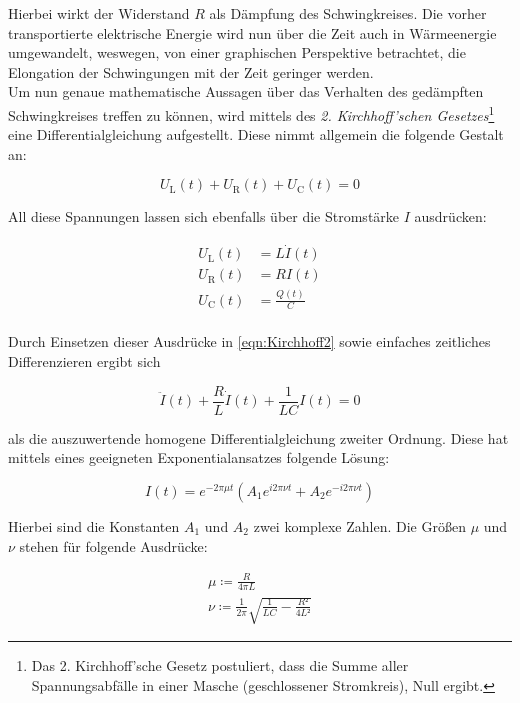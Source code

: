 \noindent Hierbei wirkt der Widerstand $R$ als Dämpfung des Schwingkreises. Die vorher transportierte elektrische Energie wird nun 
über die Zeit auch in Wärmeenergie umgewandelt, weswegen, von einer graphischen Perspektive betrachtet, die Elongation der 
Schwingungen mit der Zeit geringer werden.\\
Um nun genaue mathematische Aussagen über das Verhalten des gedämpften Schwingkreises treffen zu können, wird mittels des 
\emph{2. Kirchhoff'schen Gesetzes}\footnote{Das 2. Kirchhoff'sche Gesetz postuliert, dass die Summe aller Spannungsabfälle
in einer Masche (geschlossener Stromkreis), Null ergibt.} eine Differentialgleichung aufgestellt. Diese nimmt 
allgemein die folgende Gestalt an:

\begin{equation}
\label{eqn:Kirchhoff2}
    U_\text{L}(t) + U_\text{R}(t) + U_\text{C}(t) = 0
\end{equation}

\noindent All diese Spannungen lassen sich ebenfalls über die Stromstärke $I$ ausdrücken:

\begin{align*}
    U_\text{L}(t) &= L\dot{I}(t) \\
    U_\text{R}(t) &= RI(t) \\
    U_\text{C}(t) &= \frac{Q(t)}{C} \\
\end{align*}

\noindent Durch Einsetzen dieser Ausdrücke in \eqref{eqn:Kirchhoff2} sowie einfaches zeitliches Differenzieren ergibt sich

\begin{equation*}
    \ddot{I}(t) + \frac{R}{L}\dot{I}(t) + \frac{1}{LC}I(t) = 0
\end{equation*}

\noindent als die auszuwertende homogene Differentialgleichung zweiter Ordnung. Diese hat mittels eines geeigneten Exponentialansatzes 
folgende Lösung:

\begin{equation}
\label{eqn:solutionDGL}
    I(t) = e^{-2\pi\mu{}t}\left(A_1e^{i2\pi\nu{}t} + A_2e^{-i2\pi\nu{}t}\right)
\end{equation}

\noindent Hierbei sind die Konstanten $A_1$ und $A_2$ zwei komplexe Zahlen. Die Größen $\mu$ und $\nu$ stehen 
für folgende Ausdrücke:

\begin{gather*}
    \mu \coloneqq \frac{R}{4\pi{}L} \\
    \nu \coloneqq \frac{1}{2\pi}\sqrt{\frac{1}{LC} - \frac{R²}{4L²}}
\end{gather*}
